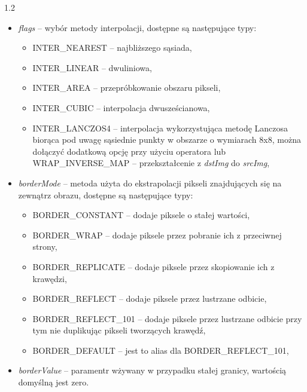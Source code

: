 \documentclass[a4paper,12pt]{article}
\newcommand\spacingInSolemnItemize{1.2}
\begin{document}
                \begin{spacing}{\spacingInSolemnItemize}
                \begin{itemize}
                    \item \textit{flags} -- wybór metody interpolacji, 
                    dostępne są następujące typy:
                    \begin{itemize}
                        \item INTER\_NEAREST -- najbliższego sąsiada, 
                        \item INTER\_LINEAR -- dwuliniowa,
                        \item INTER\_AREA -- przepróbkowanie obszaru pikseli,
                        \item INTER\_CUBIC -- interpolacja dwusześcianowa,
                  
                        \item INTER\_LANCZOS4 -- interpolacja wykorzystująca metodę Lanczosa biorąca pod uwagę sąsiednie punkty w obszarze o wymiarach 8x8,
                    można dołączyć dodatkową opcję przy użyciu operatora lub WRAP\_INVERSE\_MAP -- przekształcenie z \textit{dstImg} do \textit{srcImg},
                    \end{itemize}
                    \item\textit{borderMode} -- metoda użyta do ekstrapolacji pikseli znajdujących się na zewnątrz obrazu, dostępne są następujące typy:
                    
                    \begin{itemize}
                    \item BORDER\_CONSTANT -- dodaje piksele o stałej wartości,
                    \item BORDER\_WRAP -- dodaje piksele przez pobranie ich z przeciwnej strony,
                    \item BORDER\_REPLICATE -- dodaje piksele przez skopiowanie ich z krawędzi,
                    \item BORDER\_REFLECT -- dodaje piksele przez lustrzane odbicie,
                    \item BORDER\_REFLECT\_101 -- dodaje piksele przez lustrzane odbicie przy tym nie duplikując pikseli tworzących krawędź,
                    \item BORDER\_DEFAULT -- jest to alias dla  BORDER\_REFLECT\_101,
                    \end{itemize}
                    \item \textit{borderValue} -- paramentr wżywany w przypadku stałej granicy, wartością domyślną jest zero.  
        		 \end{itemize}
        		 \end{spacing}
        		 
\end{document}
